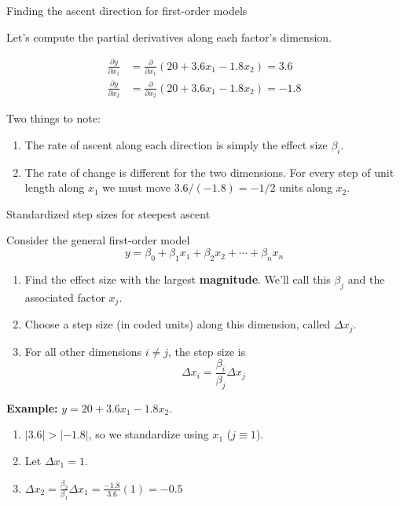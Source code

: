 \documentclass[10pt]{beamer}\usepackage[]{graphicx}\usepackage[]{color}
\begin{document}
\begin{frame}{Finding the ascent direction for first-order models}

Let's compute the partial derivatives along each factor's dimension.

\begin{align*}
  \frac{\partial y}{\partial x_1} &= \frac{\partial}{\partial x_1}\left( 20 + 3.6x_1 - 1.8x_2 \right) = 3.6 \\
  \frac{\partial y}{\partial x_2} &= \frac{\partial}{\partial x_2}\left( 20 + 3.6x_1 - 1.8x_2 \right) = -1.8
\end{align*}

\pause
\bigskip
Two things to note:
\begin{enumerate}
  \item The rate of ascent along each direction is simply the effect size $\beta_i$.
  \item The rate of change is different for the two dimensions. For every step of unit length along $x_1$ we must move $3.6/(-1.8)=-1/2$ units along $x_2$.
\end{enumerate}

\end{frame}

\begin{frame}{Standardized step sizes for steepest ascent}

Consider the general first-order model
\[ y = \beta_0 + \beta_1x_1 + \beta_2x_2 + \cdots + \beta_nx_n \]

\begin{enumerate}
  \item Find the effect size with the largest \textbf{magnitude}. We'll call this $\beta_j$ and the associated factor $x_j$.
  \item Choose a step size (in coded units) along this dimension, called $\Delta x_j$.
  \item For all other dimensions $i\ne j$, the step size is
    \[ \Delta x_i = \frac{\beta_i}{\beta_j}\Delta x_j \]
\end{enumerate}

\pause
\textbf{Example:} $y = 20 + 3.6x_1 - 1.8x_2$.
\begin{enumerate}
  \item<3-> $|3.6| > |-1.8|$, so we standardize using $x_1$ ($j\equiv1$).
  \item<4-> Let $\Delta x_1=1$.
  \item<5-> $\Delta x_2 = \frac{\beta_2}{\beta_1}\Delta x_1 = \frac{-1.8}{3.6}(1) = -0.5$
\end{enumerate}

\end{frame}
\end{document}
